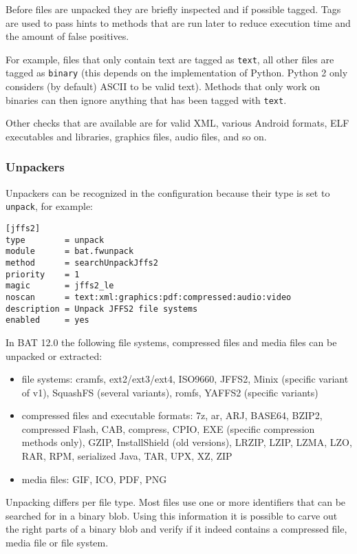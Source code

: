 \documentclass[10pt]{article}
\begin{document}
Before files are unpacked they are briefly inspected and if possible tagged.
Tags are used to pass hints to methods that are run later to reduce execution
time and the amount of false positives.

For example, files that only contain text are tagged as \texttt{text}, all other
files are tagged as \texttt{binary} (this depends on the implementation of
Python. Python 2 only considers (by default) ASCII to be valid text). Methods
that only work on binaries can then ignore anything that has been tagged with
\texttt{text}.

Other checks that are available are for valid XML, various Android formats,
ELF executables and libraries, graphics files, audio files, and so on.

\subsubsection{Unpackers}

Unpackers can be recognized in the configuration because their type is set
to \texttt{unpack}, for example:

\begin{verbatim}
[jffs2]
type        = unpack
module      = bat.fwunpack
method      = searchUnpackJffs2
priority    = 1
magic       = jffs2_le
noscan      = text:xml:graphics:pdf:compressed:audio:video
description = Unpack JFFS2 file systems
enabled     = yes
\end{verbatim}

In BAT 12.0 the following file systems, compressed files and media files can be
unpacked or extracted:

\begin{itemize}
\item file systems: cramfs, ext2/ext3/ext4, ISO9660, JFFS2, Minix (specific
variant of v1), SquashFS (several variants), romfs, YAFFS2 (specific variants)
\item compressed files and executable formats: 7z, ar, ARJ, BASE64, BZIP2,
compressed Flash, CAB, compress, CPIO, EXE (specific compression methods only),
GZIP, InstallShield (old versions), LRZIP, LZIP, LZMA, LZO, RAR, RPM, serialized
Java, TAR, UPX, XZ, ZIP
\item media files: GIF, ICO, PDF, PNG
\end{itemize}

Unpacking differs per file type. Most files use one or more identifiers that
can be searched for in a binary blob. Using this information it is possible
to carve out the right parts of a binary blob and verify if it indeed contains
a compressed file, media file or file system.
\end{document}
